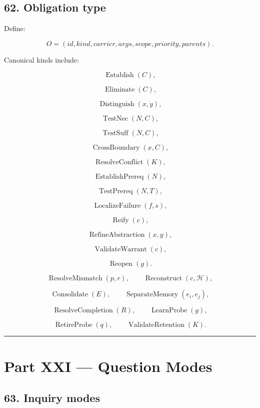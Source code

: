 \documentclass[
]{article}
\begin{document}
\subsection{62. Obligation type}\label{obligation-type}

Define:

\[
\boxed{
O
=
(
id,
kind,
carrier,
args,
scope,
priority,
parents
).
}
\]

Canonical kinds include:

\[
\operatorname{Establish}(C),
\]

\[
\operatorname{Eliminate}(C),
\]

\[
\operatorname{Distinguish}(x,y),
\]

\[
\operatorname{TestNec}(N,C),
\]

\[
\operatorname{TestSuff}(N,C),
\]

\[
\operatorname{CrossBoundary}(x,C),
\]

\[
\operatorname{ResolveConflict}(K),
\]

\[
\operatorname{EstablishPrereq}(N),
\]

\[
\operatorname{TestPrereq}(N,T),
\]

\[
\operatorname{LocalizeFailure}(f,s),
\]

\[
\operatorname{Reify}(c),
\]

\[
\operatorname{RefineAbstraction}(x,y),
\]

\[
\operatorname{ValidateWarrant}(c),
\]

\[
\operatorname{Reopen}(g).
\]

\[
\operatorname{ResolveMismatch}(p,r),
\qquad
\operatorname{Reconstruct}(c,\mathcal H),
\]

\[
\operatorname{Consolidate}(E),
\qquad
\operatorname{SeparateMemory}(e_i,e_j),
\]

\[
\operatorname{ResolveCompletion}(R),
\qquad
\operatorname{LearnProbe}(g),
\]

\[
\operatorname{RetireProbe}(q),
\qquad
\operatorname{ValidateRetention}(K).
\]

\begin{center}\rule{0.5\linewidth}{0.5pt}\end{center}

\section{Part XXI --- Question Modes}\label{part-xxi-question-modes}

\subsection{63. Inquiry modes}\label{inquiry-modes}
\end{document}
